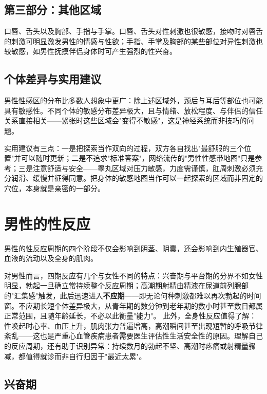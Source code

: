 \documentclass[12pt,a4paper,twoside]{ctexbook}
\begin{document}
\subsection{第三部分：其他区域}

口唇、舌头以及胸部、手指与手掌。口唇、舌头对性刺激也很敏感，接吻时对唇舌的刺激可明显激发男性的情感与性欲；手指、手掌及胸部的某些部位对异性刺激也较敏感，如男性抚摸伴侣身体时可产生强烈的性兴奋。

\subsection{个体差异与实用建议}

男性性感区的分布比多数人想象中更广：除上述区域外，颈后与耳后等部位也可能具有敏感性。不同个体的敏感分布差异极大，且与情绪、放松程度、与伴侣的信任关系直接相关——紧张时这些区域会"变得不敏感"，这是神经系统而非技巧的问题。

实用建议有三点：一是把探索当作双向的过程，双方各自找出"最舒服的三个位置"并可以随时更新；二是不追求"标准答案"，网络流传的"男性性感带地图"只是参考；三是注意舒适与安全——睾丸区域对压力敏感，力度需谨慎，肛周刺激必须充分润滑、缓慢并征得同意。把身体的敏感地图当作可以一起探索的区域而非固定的穴位，本身就是亲密的一部分。


\section{男性的性反应}


男性的性反应周期的四个阶段不仅会影响到阴茎、阴囊，还会影响到内生殖器官、血液的流动以及全身的肌肉。


对男性而言，四期反应有几个与女性不同的特点：兴奋期与平台期的分界不如女性明显，勃起一旦确立常持续整个反应周期；高潮期射精由精液在尿道前列腺部的"汇集感"触发，此后迅速进入\textbf{不应期}——即无论何种刺激都难以再次勃起的时间窗。不应期长短个体差异极大，从青年期的数分钟到老年期的数小时甚至数日都属正常范围，且随年龄延长，不必以此衡量"能力"。
此外，全身性反应值得了解：性唤起时心率、血压上升，肌肉张力普遍增高，高潮瞬间甚至出现短暂的呼吸节律紊乱——这也是严重心血管疾病患者需要医生评估性生活安全性的原因。理解自己的反应周期，还有助于识别异常：持续数月的勃起不坚、高潮时疼痛或射精量骤减，都值得就诊而非自行归因于"最近太累"。

\subsection{兴奋期}
\end{document}
